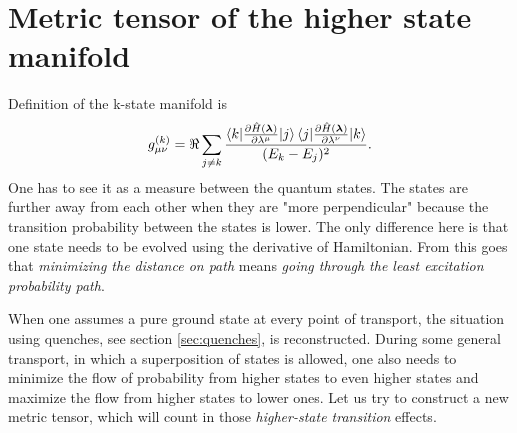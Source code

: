 \chapter{Metric tensor of the higher state manifold}
Definition of the k-state manifold is
\begin{equation}
    g_{\mu\nu}^{(k)} = \Re \sum_{j\neq k}\frac{\braket{k|\frac{\partial \hat{H}({\bm\lambda})}{\partial \lambda^\mu}|j}\braket{j|\frac{\partial \hat{H}({\bm\lambda})}{\partial \lambda^\nu}|k}}{(E_k-E_j)^2}.
    \label{eq:metrictensork}
\end{equation}
One has to see it as a measure between the quantum states. The states are further away from each other when they are "more perpendicular" because the transition probability between the states is lower. The only difference here is that one state needs to be evolved using the derivative of Hamiltonian. From this goes that \emph{minimizing the distance on path} means \emph{going through the least excitation probability path}.

When one assumes a pure ground state at every point of transport, the situation using quenches, see section \ref{sec:quenches}, is reconstructed. During some general transport, in which a superposition of states is allowed, one also needs to minimize the flow of probability from higher states to even higher states and maximize the flow from higher states to lower ones. Let us try to construct a new metric tensor, which will count in those \emph{higher-state transition} effects.

